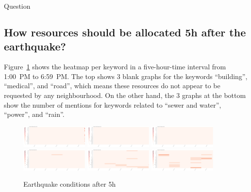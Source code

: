 \documentclass{article}
\begin{document}
\begin{section}{Question}
\subsection{How resources should be allocated 5h after the earthquake?}
Figure~\ref{fig:eq_cond_5h} shows the heatmap per keyword in a five-hour-time 
interval from 1:00~PM to 6:59~PM. The top shows 3 blank graphs for the keywords
``building'', ``medical'', and ``road'', which means these resources do not 
appear to be requested by any neighbourhood. On the other hand, the 3 graphs at
the bottom show the number of mentions for keywords related to 
``sewer and water'', ``power'', and ``rain''. 
    
\begin{figure}[!h]
    \centering
    \includegraphics[width=0.30\textwidth]{figs/cond_5h/cond_5h_build.png}
    \includegraphics[width=0.30\textwidth]{figs/cond_5h/cond_5h_medical.png}
    \includegraphics[width=0.30\textwidth]{figs/cond_5h/cond_5h_road.png}\\
    \includegraphics[width=0.30\textwidth]{figs/cond_5h/cond_5h_sewer.png}
    \includegraphics[width=0.30\textwidth]{figs/cond_5h/cond_5h_power.png}
    \includegraphics[width=0.30\textwidth]{figs/cond_5h/cond_5h_rain.png}
    \caption{Earthquake conditions after 5h}
    \label{fig:eq_cond_5h}
\end{figure}


\end{section}
\end{document}
